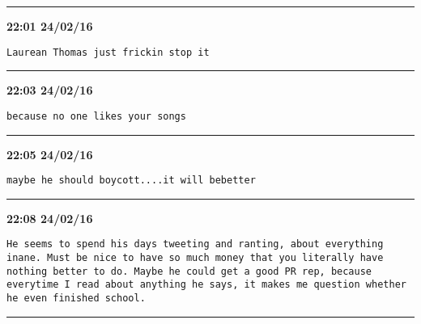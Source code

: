\hrule%

\begin{adjustwidth}{0cm}{0cm}
\footnotesize \textbf{22:01 24/02/16}

\begin{lstlisting}[breaklines, breakatwhitespace, basicstyle=\small, frame=leftline]
Laurean Thomas just frickin stop it
\end{lstlisting}
\end{adjustwidth}

\hrule%

\begin{adjustwidth}{0cm}{0cm}
\footnotesize \textbf{22:03 24/02/16}

\begin{lstlisting}[breaklines, breakatwhitespace, basicstyle=\small, frame=leftline]
because no one likes your songs
\end{lstlisting}
\end{adjustwidth}

\hrule%

\begin{adjustwidth}{0cm}{0cm}
\footnotesize \textbf{22:05 24/02/16}

\begin{lstlisting}[breaklines, breakatwhitespace, basicstyle=\small, frame=leftline]
maybe he should boycott....it will bebetter
\end{lstlisting}
\end{adjustwidth}

\hrule%

\begin{adjustwidth}{0cm}{0cm}
\footnotesize \textbf{22:08 24/02/16}

\begin{lstlisting}[breaklines, breakatwhitespace, basicstyle=\small, frame=leftline]
He seems to spend his days tweeting and ranting, about everything inane. Must be nice to have so much money that you literally have nothing better to do. Maybe he could get a good PR rep, because everytime I read about anything he says, it makes me question whether he even finished school.
\end{lstlisting}
\end{adjustwidth}

\hrule%

